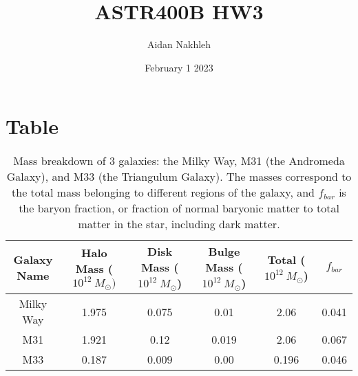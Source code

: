\documentclass{article}
\begin{document}
\title{ASTR400B HW3}
\author{Aidan Nakhleh}
\date{February 1 2023}


\maketitle

\section{Table}


\begin{table}[h!]
\begin{center}
 \begin{tabular}{||c c c c c c||} 
 \hline
Galaxy Name & Halo Mass ($10^{12}\ M_\odot) $ & Disk Mass ($10^{12}\ M_\odot$) & Bulge Mass ($10^{12}\ M_\odot$) & Total ($10^{12}\ M_\odot$) & $f_{bar}$\\ [0.5ex]
  \hline \hline
Milky Way  & 1.975 & 0.075 & 0.01 & 2.06 & 0.041 \\
\hline
M31  & 1.921 & 0.12 &  0.019 & 2.06 & 0.067 \\
\hline
M33  &  0.187 & 0.009 & 0.00 & 0.196 & 0.046\\
\hline
 \end{tabular}
 \caption{\label{tab:compton_data} Mass breakdown of 3 galaxies: the Milky Way, M31 (the Andromeda Galaxy), and M33 (the Triangulum Galaxy). The masses correspond to the total mass belonging to different regions of the galaxy, and $f_{bar}$ is the baryon fraction, or fraction of normal baryonic matter to total matter in the star, including dark matter.}
\end{center}
\end{table}
\end{document}
